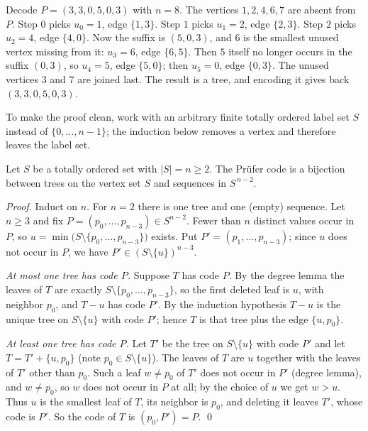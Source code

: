\documentclass[11pt]{article}
\begin{document}
\begin{examplebox}
Decode $P=(3,3,0,5,0,3)$ with $n=8$. The vertices $1,2,4,6,7$ are absent
from $P$. Step $0$ picks $u_0=1$, edge $\{1,3\}$. Step $1$ picks $u_1=2$,
edge $\{2,3\}$. Step $2$ picks $u_2=4$, edge $\{4,0\}$. Now the suffix is
$(5,0,3)$, and $6$ is the smallest unused vertex missing from it:
$u_3=6$, edge $\{6,5\}$. Then $5$ itself no longer occurs in the suffix
$(0,3)$, so $u_4=5$, edge $\{5,0\}$; then $u_5=0$, edge $\{0,3\}$. The
unused vertices $3$ and $7$ are joined last. The result is a tree, and
encoding it gives back $(3,3,0,5,0,3)$.
\end{examplebox}

To make the proof clean, work with an arbitrary finite totally ordered
label set $S$ instead of $\{0,\dots,n-1\}$; the induction below removes a
vertex and therefore leaves the label set.

\begin{theorembox}
Let $S$ be a totally ordered set with $|S|=n\ge2$. The Prüfer code is a
bijection between trees on the vertex set $S$ and sequences in $S^{\,n-2}$.

\emph{Proof.} Induct on $n$. For $n=2$ there is one tree and one (empty)
sequence. Let $n\ge3$ and fix $P=(p_0,\dots,p_{n-3})\in S^{n-2}$. Fewer
than $n$ distinct values occur in $P$, so
$u=\min\bigl(S\setminus\{p_0,\dots,p_{n-3}\}\bigr)$ exists. Put
$P'=(p_1,\dots,p_{n-3})$; since $u$ does not occur in $P$, we have
$P'\in(S\setminus\{u\})^{n-3}$.

\emph{At most one tree has code $P$.} Suppose $T$ has code $P$. By the
degree lemma the leaves of $T$ are exactly $S\setminus\{p_0,\dots,p_{n-3}\}$,
so the first deleted leaf is $u$, with neighbor $p_0$, and $T-u$ has code
$P'$. By the induction hypothesis $T-u$ is the unique tree on
$S\setminus\{u\}$ with code $P'$; hence $T$ is that tree plus the edge
$\{u,p_0\}$.

\emph{At least one tree has code $P$.} Let $T'$ be the tree on
$S\setminus\{u\}$ with code $P'$ and let $T=T'+\{u,p_0\}$ (note
$p_0\in S\setminus\{u\}$). The leaves of $T$ are $u$ together with the
leaves of $T'$ other than $p_0$. Such a leaf $w\ne p_0$ of $T'$ does not
occur in $P'$ (degree lemma), and $w\ne p_0$, so $w$ does not occur in $P$
at all; by the choice of $u$ we get $w>u$. Thus $u$ is the smallest leaf of
$T$, its neighbor is $p_0$, and deleting it leaves $T'$, whose code is
$P'$. So the code of $T$ is $(p_0,P')=P$. \qed
\end{theorembox}
\end{document}
